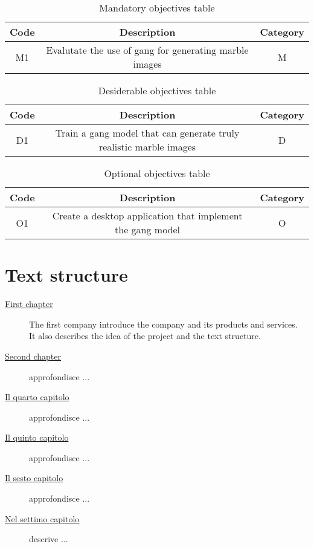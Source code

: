\begin{table}[H] 
    \caption{Mandatory objectives table}
    \label{tab:man-objectives}
    \centering
    \begin{tabularx}{\textwidth}{|c|c|c|}
        \hline
        \textbf{Code} & \textbf{Description} & \textbf{Category}\\
        \hline
        M1 & Evalutate the use of \gls{gang} for generating marble images  & M\\
    \end{tabularx}
\end{table}

\begin{table}[H] 
    \caption{Desiderable objectives table}
    \label{tab:des-objectives}
    \centering
    \begin{tabularx}{\textwidth}{|c|c|c|}
        \hline
        \textbf{Code} & \textbf{Description} & \textbf{Category}\\
        \hline
        D1 & Train a \gls{gang} model that can generate truly realistic marble images & D\\
    \end{tabularx}
\end{table}

\begin{table}[H] 
    \caption{Optional objectives table}
    \label{tab:opt-objectives}
    \centering
    \begin{tabularx}{\textwidth}{|c|c|c|}
        \hline
        \textbf{Code} & \textbf{Description} & \textbf{Category}\\
        \hline
        O1 & Create a desktop application that implement the \gls{gang} model & O\\
    \end{tabularx}
\end{table}
\section{Text structure}

\begin{description}
    \item[{\hyperref[cap:Introduction]{First chapter}}] 
    The first company introduce the company and its products and services.\\
    It also describes the idea of the project and the text structure.

    
    \item[{\hyperref[cap:descrizione-stage]{Second chapter}}] approfondisce ...
    
    \item[{\hyperref[cap:analisi-requisiti]{Il quarto capitolo}}] approfondisce ...
    
    \item[{\hyperref[cap:progettazione-codifica]{Il quinto capitolo}}] approfondisce ...
    
    \item[{\hyperref[cap:verifica-validazione]{Il sesto capitolo}}] approfondisce ...
    
    \item[{\hyperref[cap:conclusioni]{Nel settimo capitolo}}] descrive ...
\end{description}

